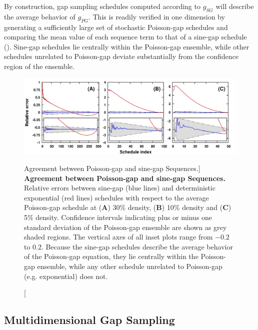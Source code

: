 \begin{doublespace}
By construction, gap sampling schedules computed according to $g_{SG}$ will
describe the average behavior of $g_{PG}$. This is readily verified in one
dimension by generating a sufficiently large set of stochastic Poisson-gap
schedules and comparing the mean value of each sequence term to that of a
sine-gap schedule (). Sine-gap schedules
lie centrally within the Poisson-gap ensemble, while other schedules
unrelated to Poisson-gap deviate substantially from the confidence
region of the ensemble.
\end{doublespace}

\begin{figure}[ht!]
\includegraphics[width=6.5in]{figs/dgs/01-avepg.png}
\caption
      [Agreement between Poisson-gap and sine-gap Sequences.]{
  {\bf Agreement between Poisson-gap and sine-gap Sequences.}
  \\
  Relative errors between sine-gap (blue lines) and deterministic exponential
  (red lines) schedules with respect to the average Poisson-gap schedule at
  ({\bf A}) 30\% density, ({\bf B}) 10\% density and ({\bf C}) 5\% density.
  Confidence intervals indicating plus or minus one standard deviation of the
  Poisson-gap ensemble are shown as grey shaded regions. The vertical axes of
  all inset plots range from $-0.2$ to $0.2$. Because the sine-gap schedules
  describe the average behavior of the Poisson-gap equation, they lie
  centrally within the Poisson-gap ensemble, while any other schedule
  unrelated to Poisson-gap (e.g. exponential) does not.
}
\label{figure.2.1}
\end{figure}

\subsection{Multidimensional Gap Sampling}

